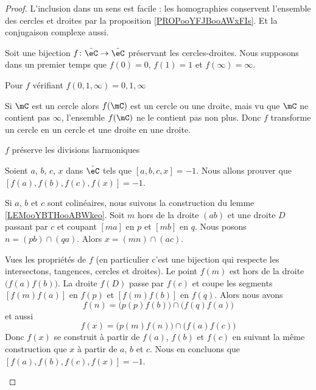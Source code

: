 \begin{proof}
    L'inclusion dans un sens est facile : les homographies conservent l'ensemble des cercles et droites par la proposition \ref{PROPooYFJBooAWxFIs}. Et la conjugaison complexe aussi.

    Soit une bijection \( f\colon \hat \eC\to \hat\eC\) préservant les cercles-droites. Nous supposons dans un premier temps que \( f(0)=0\), \( f(1)=1\) et \( f(\infty)=\infty\).

    \begin{subproof}
        \item[Pour \( f\) vérifiant \( f(0,1,\infty)=0,1,\infty\)]

            Si \( \mC\) est un cercle alors \( f(\mC)\) est un cercle ou une droite, mais vu que \( \mC\) ne contient pas \( \infty\), l'ensemble \( f(\mC)\) ne le contient pas non plus. Donc \( f\) transforme un cercle en un cercle et une droite en une droite.

            \begin{subproof}
                \item[\( f\) préserve les divisions harmoniques] 

                    Soient \( a\), \( b\), \( c\), \( x\) dans \( \hat\eC\) tels que \( [a,b,c,x]=-1\). Nous allons prouver que \( [f(a),f(b),f(c),f(x)]=-1\).


                    Si \( a\), \( b\) et \( c\) sont colinéaires, nous suivons la construction du lemme \ref{LEMooYBTHooABWkeo}. Soit \( m\) hors de la droite \( (ab)\) et une droite \( D\) passant par \( c\) et coupant \( [ma]\) en \( p\) et \( [mb]\) en \( q\). Nous posons \( n=(pb)\cap(qa)\). Alors \( x=(mn)\cap(ac)\).

                            Vues les propriétés de \( f\) (en particulier c'est une bijection qui respecte les intersectons, tangences, cercles et droites). Le point \( f(m)\) est hors de la droite \( \big( f(a)f(b) \big)\). La droite \( f(D)\) passe par \( f(c)\) et coupe les segments \( [f(m)f(a)]\) en \( f(p)\) et \( [f(m)f(b)]\) en \( f(q)\). Alors nous avons 
                            \begin{equation}
                                f(n)=\big( p(p)f(b) \big)\cap\big( f(q)f(a) \big)
                            \end{equation}
                            et aussi
                            \begin{equation}
                                f(x)=\big( p(m)f(n) \big)\cap\big( f(a)f(c) \big)
                            \end{equation}
                            Donc \( f(x)\) se construit à partir de \( f(a)\), \( f(b)\) et \( f(c)\) en suivant la même construction que \( x\) à partir de \( a\), \( b\) et \( c\). Nous en concluons que \( [f(a), f(b),f(c),f(x)]=-1\).


\end{subproof}
\end{subproof}
\end{proof}
